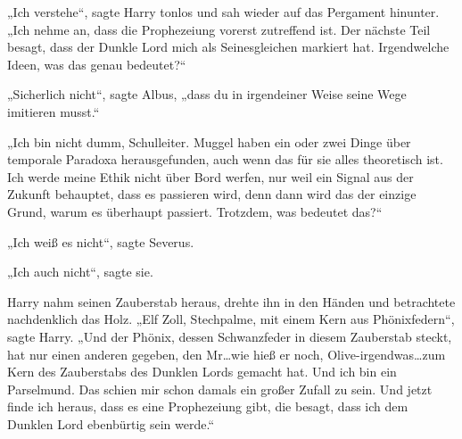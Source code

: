 „Ich verstehe“, sagte Harry tonlos und sah wieder auf das Pergament hinunter. „Ich nehme an, dass die Prophezeiung vorerst zutreffend ist. Der nächste Teil besagt, dass der Dunkle Lord mich als Seinesgleichen markiert hat. Irgendwelche Ideen, was das genau bedeutet?“

„Sicherlich nicht“, sagte Albus, „dass du in irgendeiner Weise seine Wege imitieren musst.“

„Ich bin nicht dumm, Schulleiter. Muggel haben ein oder zwei Dinge über temporale Paradoxa herausgefunden, auch wenn das für sie alles theoretisch ist. Ich werde meine Ethik nicht über Bord werfen, nur weil ein Signal aus der Zukunft behauptet, dass es passieren wird, denn dann wird das der einzige Grund, warum es überhaupt passiert. Trotzdem, was bedeutet das?“

„Ich weiß es nicht“, sagte Severus.

„Ich auch nicht“, sagte sie.

Harry nahm seinen Zauberstab heraus, drehte ihn in den Händen und betrachtete nachdenklich das Holz. „Elf Zoll, Stechpalme, mit einem Kern aus Phönixfedern“, sagte Harry. „Und der Phönix, dessen Schwanzfeder in diesem Zauberstab steckt, hat nur einen anderen gegeben, den Mr…wie hieß er noch, Olive-irgendwas…zum Kern des Zauberstabs des Dunklen Lords gemacht hat. Und ich bin ein Parselmund. Das schien mir schon damals ein großer Zufall zu sein. Und jetzt finde ich heraus, dass es eine Prophezeiung gibt, die besagt, dass ich dem Dunklen Lord ebenbürtig sein werde.“

